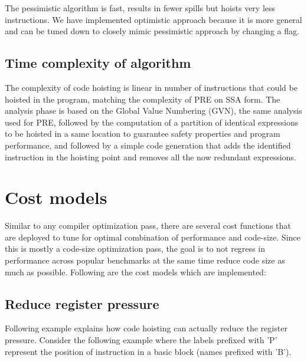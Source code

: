 \documentclass{sig-alternate}
\begin{document}
The pessimistic algorithm is fast, results in fewer spills but hoists very less
instructions. We have implemented optimistic approach because it is more general
and can be tuned down to closely mimic pessimistic approach by changing a flag.

\subsection{Time complexity of algorithm}
The complexity of code hoisting is linear in number of instructions that could
be hoisted in the program, matching the complexity of PRE on SSA form.  The
analysis phase is based on the Global Value Numbering (GVN), the same analysis
used for PRE, followed by the computation of a partition of identical
expressions to be hoisted in a same location to guarantee safety properties and
program performance, and followed by a simple code generation that adds the
identified instruction in the hoisting point and removes all the now redundant
expressions.

\section{Cost models}
\label{sec:cost-models}
Similar to any compiler optimization pass, there are several cost functions that
are deployed to tune for optimal combination of performance and code-size.
Since this is mostly a code-size optimization pass, the goal is to not regress
in performance across popular benchmarks at the same time reduce code size as
much as possible. Following are the cost models which are implemented:

\subsection{Reduce register pressure}
\label{hoist:reg-pressure}
Following example explains how code hoisting can actually reduce the register
pressure.  Consider the following example where the labels prefixed with 'P'
represent the position of instruction in a basic block (names prefixed with 'B').
\end{document}
